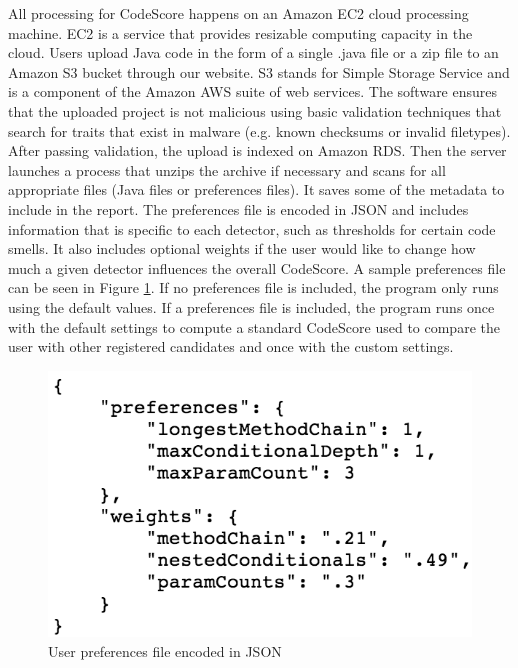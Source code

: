 \documentclass{sig-alternate}
\begin{document}
All processing for CodeScore happens on an Amazon EC2 cloud processing machine.
EC2 is a service that provides resizable computing capacity in the cloud. 
Users upload Java code in the form of a single .java file or a zip file to an
Amazon S3 bucket through our website. S3 stands for Simple Storage Service and is
a component of the Amazon AWS suite of web services. The software ensures that the uploaded project is not
malicious using basic validation techniques that search for traits that exist in
malware (e.g. known checksums or invalid filetypes). After passing validation,
the upload is indexed on Amazon RDS. Then the server
launches a process that unzips the archive if necessary and scans for all appropriate files (Java files or
preferences files). It saves some of the metadata to include in the report. The preferences 
file is encoded in JSON and includes information that is specific to each detector, 
such as thresholds for certain code smells. It also includes optional weights if
the user would like to change how much a given detector influences the overall
CodeScore. A sample preferences file can be
seen in Figure \ref{fig: json}. If no preferences
file is included, the program only runs using the default values. If a
preferences file is included, the program runs once with the default settings to
compute a standard CodeScore used to compare the user with other registered candidates and
once with the custom settings. 

\begin{figure}[ht]
	\begin{center}
		\includegraphics[width=0.9\linewidth]{json}
	\end{center}
	\vspace{-12pt}
	\caption{User preferences file encoded in JSON}
	\label{fig: json}
\end{figure}
\end{document}
